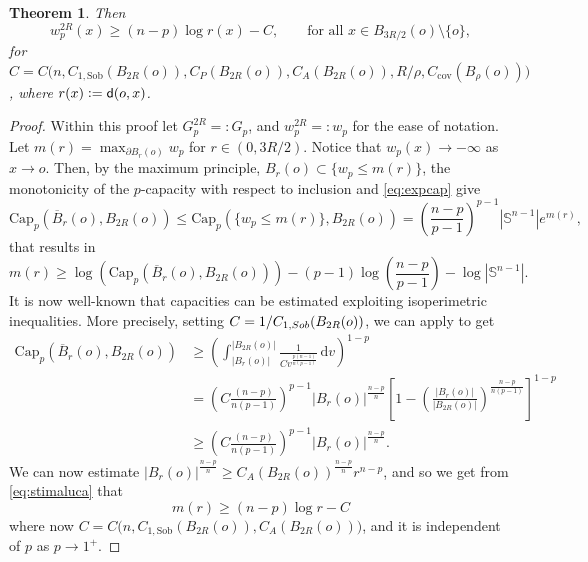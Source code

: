 \documentclass[a4paper,12pt,reqno]{amsart}
\numberwithin{equation}{section}
\theoremstyle{plain}
\newtheorem{theorem}{Theorem}[section]
\theoremstyle{definition}
\theoremstyle{remark}
\newcommand{\abs}[1]{\left\lvert#1\right\rvert}
\newcommand{\eqdef}{\ensuremath{\vcentcolon=}}
\newcommand{\dist}{\mathsf{d}}
\newcommand{\de}{\ensuremath{\,\mathrm d}} %
\begin{document}
{\begin{theorem}
Then 
\begin{equation}
\label{eq:estimatepharmonic}
        w_p^{2R}(x) \geq (n-p) \log r(x) -  C, \qquad \text{for all $x\in B_{3R/2}(o)\setminus\{o\}$},
    \end{equation}
for $C=C\big(n, C_{1, \mathrm{Sob}}(B_{2R}(o)), C_P(B_{2R}(o)), C_A(B_{2R}(o)), R/\rho, C_{\mathrm{cov}}(B_\rho(o))\big)$, where $r(x)\eqdef \dist(o,x)$.
\end{theorem}

\begin{proof}
Within this proof let $G_p^{2R} =: G_p$, and $w_p^{2R} =: w_p$ for the ease of notation. Let $m(r)=\max_{\partial B_r(o)} w_p$ for $r \in (0, 3R/2)$. Notice that $w_p(x)\to -\infty$ as $x\to o$. Then, by the maximum principle, $B_r (o) \subset \{w_p \leq m(r)\}$, the monotonicity of the $p$-capacity with respect to inclusion and \eqref{eq:expcap} give
\begin{equation*}
    \label{eq:stimaluca1}
    \mathrm{Cap}_p (\overline{B}_r(o), B_{2R}(o)) \leq \mathrm{Cap}_p (\{w_p \leq m(r)\}, B_{2R}(o)) = \left(\frac{n-p}{p-1}\right)^{p-1}\abs{\mathbb{S}^{n-1}} e^{m(r)}, 
\end{equation*}
that results in
\begin{equation}\label{eq:stimaluca}
    m(r) \geq \log (\mathrm{Cap}_p (\overline{B}_r(o), B_{2R}(o))) - (p-1) \log \left(\frac{n-p}{p-1}\right) - \log \abs{\mathbb{S}^{n-1}}.
\end{equation}
It is now well-known that capacities can be estimated exploiting isoperimetric inequalities. More precisely, setting $C =  1/ C_{1, {\rm Sob}}(B_{2R}(o))$, we can apply \cite[Eq. (1.7) p. 141]{grigoryan-isocap} to get
\begin{equation*}
\begin{split}
\mathrm{Cap}_p (\overline{B}_r(o), B_{2R}(o)) &\geq \left(\int_{\abs{B_r(o)}}^{\abs{B_{2R}(o)}}\frac{1}{C v^{\frac{p(n-1)}{n(p-1)}}}  \de v \right)^{1-p}  \\
&= \left(C \frac{(n-p)}{n(p-1)} \right)^{p-1} \abs{B_{r}(o)}^{\frac{n-p}{n}} \left[1 - \left(\frac{\abs{B_r(o)}}{\abs{B_{2R}(o)}} \right)^{\frac{n-p}{n(p-1)}}\right]^{1-p} \\
&\geq \left(C \frac{(n-p)}{n(p-1)} \right)^{p-1} \abs{B_{r}(o)}^{\frac{n-p}{n}}.
\end{split}
\end{equation*}
We can now estimate $\abs{B_{r}(o)}^{\frac{n-p}{n}} \geq C_A(B_{2R}(o))^{\frac{n-p}{n}} r^{n-p}$, and so we get from \eqref{eq:stimaluca} that 
\begin{equation}\label{eq:stimaluca2}
m(r) \geq (n-p) \log r - C
\end{equation}
where now $C=C\big(n, C_{1, \mathrm{Sob}}(B_{2R}(o)), C_A(B_{2R}(o)) \big)$, and it is independent of $p$ as $p\to 1^+$. 


\end{proof}}
\end{document}

